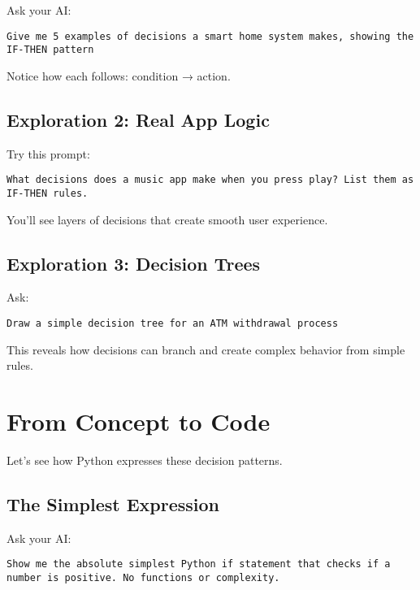\documentclass[
  letterpaper,
  DIV=11,
  numbers=noendperiod,
  oneside]{scrreprt}
\begin{document}
Ask your AI:

\begin{verbatim}
Give me 5 examples of decisions a smart home system makes, showing the IF-THEN pattern
\end{verbatim}

Notice how each follows: condition → action.

\subsection{Exploration 2: Real App
Logic}\label{exploration-2-real-app-logic}

Try this prompt:

\begin{verbatim}
What decisions does a music app make when you press play? List them as IF-THEN rules.
\end{verbatim}

You'll see layers of decisions that create smooth user experience.

\subsection{Exploration 3: Decision
Trees}\label{exploration-3-decision-trees}

Ask:

\begin{verbatim}
Draw a simple decision tree for an ATM withdrawal process
\end{verbatim}

This reveals how decisions can branch and create complex behavior from
simple rules.

\section{From Concept to Code}\label{from-concept-to-code-3}

Let's see how Python expresses these decision patterns.

\subsection{The Simplest Expression}\label{the-simplest-expression-3}

Ask your AI:

\begin{verbatim}
Show me the absolute simplest Python if statement that checks if a number is positive. No functions or complexity.
\end{verbatim}
\end{document}
